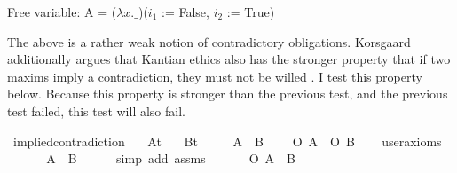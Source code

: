 \begin{isabellebody}
{  Free variable:
    A = ($\lambda x. \_$)($i_1$ := False, $i_2$ := True) \color{black}%
}\isanewline
%
\isanewline
%
\endisatagproof
{\isafoldproof}%
%
\isadelimproof
%
\endisadelimproof
%
\isadelimproof
%
\endisadelimproof
%
\isatagproof
%
\endisatagproof
{\isafoldproof}%
%
\isadelimproof
%
\endisadelimproof
%
\begin{isamarkuptext}%
The above is a rather weak notion of contradictory obligations. Korsgaard additionally argues that Kantian 
ethics also has the stronger property that if two maxims imply a contradiction, they must not be willed \cite{KorsgaardFUL}.
I test this property below. Because this property is stronger than the previous test, and the previous 
test failed, this test will also fail.%
\end{isamarkuptext}\isamarkuptrue%
\isamarkupfalse%
\ implied{\isacharunderscore}contradiction{\isacharcolon}\isanewline
\ \ \ A{\isacharcolon}{\isacharcolon}{\isachardoublequoteopen}t{\isachardoublequoteclose}\isanewline
\ \ \ B{\isacharcolon}{\isacharcolon}{\isachardoublequoteopen}t{\isachardoublequoteclose}\ \isanewline
\ \ \ {\isachardoublequoteopen}{\isasymTurnstile}{\isacharparenleft}\isactrlbold {\isasymnot}\ {\isacharparenleft}A\ \isactrlbold {\isasymand}\ B{\isacharparenright}{\isacharparenright}{\isachardoublequoteclose}\isanewline
\ \ \ {\isachardoublequoteopen}{\isasymTurnstile}{\isacharparenleft}\isactrlbold {\isasymnot}\ {\isacharparenleft}O\ {\isacharbraceleft}A{\isacharbraceright}\ \isactrlbold {\isasymand}\ O\ {\isacharbraceleft}B{\isacharbraceright}{\isacharparenright}{\isacharparenright}{\isachardoublequoteclose}\isanewline
\ \ \isamarkupfalse%
\ {\isacharbrackleft}user{\isacharunderscore}axioms{\isacharbrackright}\isanewline
%
\isadelimproof
%
\endisadelimproof
%
\isatagproof
{}\isamarkupfalse%
\ {\isacharminus}\ \isanewline
\ \ \isamarkupfalse%
\ {\isachardoublequoteopen}{\isasymTurnstile}{\isacharparenleft}\isactrlbold {\isasymnot}{\isacharparenleft}{\isasymdiamond}{\isacharparenleft}A\ \isactrlbold {\isasymand}\ B{\isacharparenright}{\isacharparenright}{\isacharparenright}{\isachardoublequoteclose}\isanewline
\ \ \ \ \isamarkupfalse%
\ {\isacharparenleft}simp\ add{\isacharcolon}\ assms{\isacharparenright}\isanewline
\ \ \isamarkupfalse%
\ \isamarkupfalse%
\ {\isachardoublequoteopen}{\isasymTurnstile}{\isacharparenleft}\isactrlbold {\isasymnot}\ {\isacharparenleft}O\ {\isacharbraceleft}A\ \isactrlbold {\isasymand}\ B{\isacharbraceright}{\isacharparenright}{\isacharparenright}{\isachardoublequoteclose}\ \isamarkupfalse%

\end{isabellebody}

